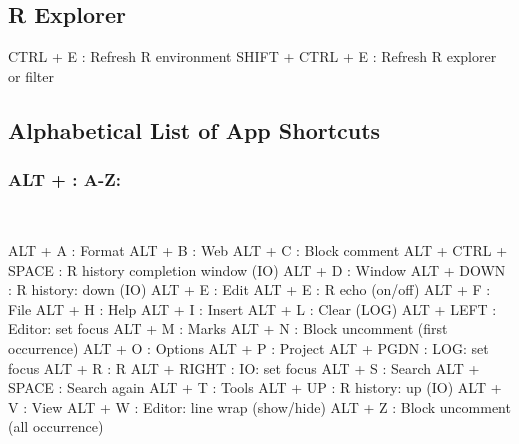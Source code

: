 \hypertarget{basic_card_rexplorer}{}
\subsection{R Explorer}

\vspace{-0.5cm}
\begin{Rtables}[caption={[R explorer keyboard shortcuts]
    R explorer keyboard shortcuts},
  label=shortcut:rexplorer]
  CTRL  + E        : Refresh R environment
  SHIFT + CTRL + E : Refresh R explorer or filter
\end{Rtables}


\newpage
\hypertarget{basic_card_alphabetical}{}
\subsection{Alphabetical List of App Shortcuts}


\subsubsection{ALT + : A-Z:}\\

\vspace{-0.5cm}
\begin{Rtables}[caption={[ALT keyboard shortcuts]
    ALT Keyboard Shortcuts},
  label=shortcut:alt]
  ALT + A            : Format
  ALT + B            : Web
  ALT + C            : Block comment
  ALT + CTRL + SPACE : R history completion window (IO)
  ALT + D            : Window
  ALT + DOWN         : R history: down (IO)
  ALT + E            : Edit
  ALT + E            : R echo (on/off)
  ALT + F            : File
  ALT + H            : Help
  ALT + I            : Insert
  ALT + L            : Clear (LOG)
  ALT + LEFT         : Editor: set focus
  ALT + M            : Marks
  ALT + N            : Block uncomment (first occurrence)
  ALT + O            : Options
  ALT + P            : Project
  ALT + PGDN         : LOG: set focus
  ALT + R            : R
  ALT + RIGHT        : IO: set focus
  ALT + S            : Search
  ALT + SPACE        : Search again
  ALT + T            : Tools
  ALT + UP           : R history: up (IO)
  ALT + V            : View
  ALT + W            : Editor: line wrap (show/hide)
  ALT + Z            : Block uncomment (all occurrence)
\end{Rtables}


